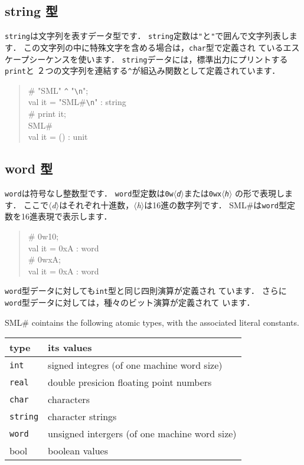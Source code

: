 \documentclass{jbook}
\newcommand{\smlsharp}{SML\#}
\newcommand{\nonterm}[1]{\mbox{$\langle$}{\it #1}\mbox{$\rangle$}}
\newenvironment{program}{\begin{quote}\begin{tt}}%
                        {\end{tt}\end{quote}}
\begin{document}
\subsection{string 型}
	{\tt string}は文字列を表すデータ型です．
	{\tt string}定数は{\tt "}と{\tt "}で囲んで文字列表します．
	この文字列の中に特殊文字を含める場合は，{\tt char}型で定義され
ているエスケープシーケンスを使います．
	{\tt string}データには，標準出力にプリントする{\tt print}と
２つの文字列を連結する{\tt \verb|^|}が組込み関数として定義されています．
\begin{program}
\# "SML" \verb|^| "\verb|\n|";\\
val it = "SML\#\verb|\n|" : string\\
\# print it;\\
SML\#\\
val it = () : unit
\end{program}

\subsection{word 型}
	{\tt word}は符号なし整数型です．
	{\tt word}型定数は{\tt 0w\nonterm{d}}または{\tt 0wx\nonterm{h}}
の形で表現します．
	ここで\nonterm{d}はそれぞれ十進数，\nonterm{h}は16進の数字列です．
	\smlsharp{}は{\tt word}型定数を16進表現で表示します．
\begin{program}
\# 0w10;\\
val it = 0xA : word\\
\# 0wxA;\\
val it = 0xA : word
\end{program}
	{\tt word}型データに対しても{\tt int}型と同じ四則演算が定義され
ています．
	さらに{\tt word}型データに対しては，種々のビット演算が定義されて
います．

\else%
	\smlsharp{} cointains the following atomic types, with the
associated literal constants.

\begin{center}
\begin{tabular}{|l|l|}
\hline
type & its values
\\ \hline
{\tt int} & signed integres (of one machine word size)
\\ \hline
{\tt real} & double presicion floating point numbers
\\ \hline
{\tt char} & characters
\\ \hline
{\tt string} & character strings
\\ \hline
{\tt word} & unsigned intergers (of one machine word size)
\\ \hline
bool & boolean values
\\ \hline
\end{tabular}
\end{center}
\end{document}
